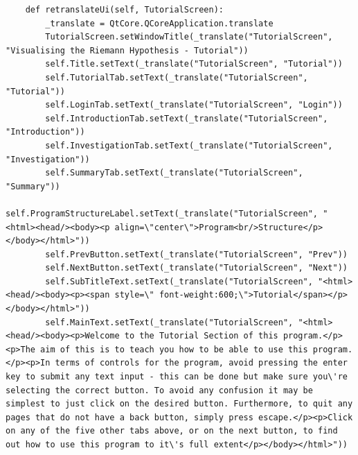 \documentclass{article}
\begin{document}
\begin{lstlisting}
    def retranslateUi(self, TutorialScreen):
        _translate = QtCore.QCoreApplication.translate
        TutorialScreen.setWindowTitle(_translate("TutorialScreen", "Visualising the Riemann Hypothesis - Tutorial"))
        self.Title.setText(_translate("TutorialScreen", "Tutorial"))
        self.TutorialTab.setText(_translate("TutorialScreen", "Tutorial"))
        self.LoginTab.setText(_translate("TutorialScreen", "Login"))
        self.IntroductionTab.setText(_translate("TutorialScreen", "Introduction"))
        self.InvestigationTab.setText(_translate("TutorialScreen", "Investigation"))
        self.SummaryTab.setText(_translate("TutorialScreen", "Summary"))
        self.ProgramStructureLabel.setText(_translate("TutorialScreen", "<html><head/><body><p align=\"center\">Program<br/>Structure</p></body></html>"))
        self.PrevButton.setText(_translate("TutorialScreen", "Prev"))
        self.NextButton.setText(_translate("TutorialScreen", "Next"))
        self.SubTitleText.setText(_translate("TutorialScreen", "<html><head/><body><p><span style=\" font-weight:600;\">Tutorial</span></p></body></html>"))
        self.MainText.setText(_translate("TutorialScreen", "<html><head/><body><p>Welcome to the Tutorial Section of this program.</p><p>The aim of this is to teach you how to be able to use this program.</p><p>In terms of controls for the program, avoid pressing the enter key to submit any text input - this can be done but make sure you\'re selecting the correct button. To avoid any confusion it may be simplest to just click on the desired button. Furthermore, to quit any pages that do not have a back button, simply press escape.</p><p>Click on any of the five other tabs above, or on the next button, to find out how to use this program to it\'s full extent</p></body></html>"))
\end{lstlisting}

\clearpage
\nocite{*}
\printbibliography
{}
\end{document}
